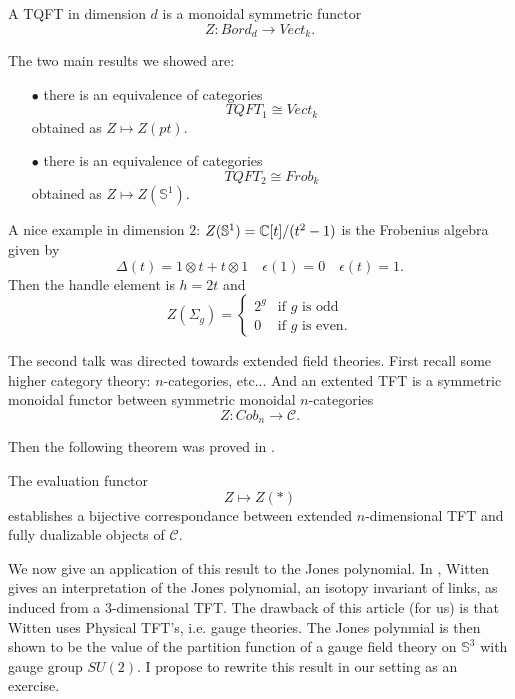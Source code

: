 \begin{definition} A TQFT in dimension $d$ is a monoidal symmetric functor
\[Z : Bord_d \rightarrow Vect_k.\] 
\end{definition}

The two main results we showed are:\\

\begin{itemize}
\item[$\bullet$] there is an equivalence of categories 
\[TQFT_1 \cong Vect_k \]
obtained as $Z \mapsto Z(pt)$.
\item[$\bullet$] there is an equivalence of categories 
\[TQFT_2 \cong Frob_k  \]
obtained as $Z \mapsto Z(\mathbb S^1)$.\\
\end{itemize}

A nice example in dimension $2$: $Z(\mathbb S^1)=\mathbb C [t]/ (t^2 -1 )$ is the Frobenius algebra given by
\[\Delta(t) = 1\otimes t + t\otimes 1 \quad \epsilon(1)=0 \quad \epsilon (t) =1.\]
Then the handle element is $h=2t$ and
\[ Z(\Sigma_g) = \left\{\begin{array}{ll} 
2^g & \text{if }g\text{ is odd} \\
0 & \text{if }g\text{ is even.}
\end{array}\right.\]  

The second talk was directed towards extended field theories. First recall some higher category theory: $n$-categories, etc... And an extented TFT is a symmetric monoidal functor between symmetric monoidal $n$-categories
\[Z : Cob_n \rightarrow \mathcal C.\]

Then the following theorem was proved in \cite{Lurie}.

\begin{thm}
The evaluation functor \[ Z \mapsto Z(*)\] establishes a bijective correspondance between extended $n$-dimensional TFT and fully dualizable objects of $\mathcal C$. 
\end{thm}

We now give an application of this result to the Jones polynomial. In \cite{WittenJones}, Witten gives an interpretation of the Jones polynomial, an isotopy invariant of links, as induced from a $3$-dimensional TFT. The drawback of this article (for us) is that Witten uses Physical TFT's, i.e. gauge theories. The Jones polynmial is then shown to be the value of the partition function of a gauge field theory on $\mathbb S^3$ with gauge group $SU(2)$. I propose to rewrite this result in our setting as an exercise. \\  


